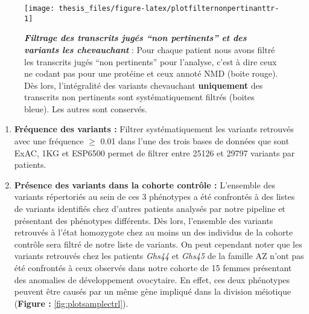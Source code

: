 \documentclass[12pt,twoside]{ugathesis}
\begin{document}
\begin{figure}

{\centering \texttt{[image: thesis\_files/figure-latex/plotfilternonpertinanttr-1]} 

}

\caption[Filtrage des transcrits jugés "non pertinents" et des variants les chevauchant]{\textbf{\emph{Filtrage des transcrits
jugés ``non pertinents'' et des variants les chevauchant}} : Pour chaque
patient nous avons filtré les transcrits jugés ``non pertinents'' pour
l'analyse, c'est à dire ceux ne codant pas pour une protéine et ceux
annoté NMD (boite rouge). Dès lors, l'intégralité des variants
chevauchant \textbf{uniquement} des transcrits non pertinents sont
systématiquement filtrés (boites bleue). Les autres sont conservés.}\label{fig:plotfilternonpertinanttr}
\end{figure}









\begin{enumerate}
\def\labelenumi{\arabic{enumi}.}
\setcounter{enumi}{4}
\item
  \textbf{Fréquence des variants :} Filtrer systématiquement les
  variants retrouvés avec une fréquence \(\ge\) 0.01 dans l'une des
  trois bases de données que sont ExAC, 1KG et ESP6500 permet de filtrer
  entre 25126 et 29797 variants par patients.
\item
  \textbf{Présence des variants dans la cohorte contrôle :} L'ensemble
  des variants répertoriés au sein de ces 3 phénotypes a été confrontés
  à des listes de variants identifiés chez d'autres patients analysés
  par notre pipeline et présentant des phénotypes différents. Dès lors,
  l'ensemble des variants retrouvés à l'état homozygote chez au moins un
  des individus de la cohorte contrôle sera filtré de notre liste de
  variants. On peut cependant noter que les variants retrouvés chez les
  patients \emph{Ghs44} et \emph{Ghs45} de la famille AZ n'ont pas été
  confrontés à ceux observés dans notre cohorte de 15 femmes présentant
  des anomalies de développement ovocytaire. En effet, ces deux
  phénotypes peuvent être causés par un même gène impliqué dans la
  division méiotique (\textbf{Figure :} \ref{fig:plotsamplectrl}).\\
  \newpage
\end{enumerate}
\end{document}
